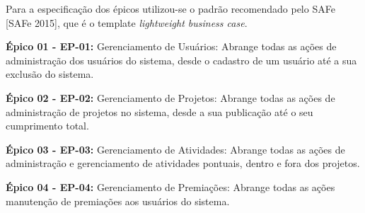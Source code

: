 Para a especificação dos épicos utilizou-se o padrão recomendado pelo SAFe [SAFe 2015], que é o template  \textit{lightweight business case}.

\textbf{Épico 01 - EP-01:} Gerenciamento de Usuários: Abrange todas as ações de administração dos usuários do sistema, desde o cadastro de um usuário até a sua exclusão do sistema.

\textbf{Épico 02 - EP-02:} Gerenciamento de Projetos: Abrange todas as ações de administração de projetos no sistema, desde a sua publicação até o seu cumprimento total.

\textbf{Épico 03 - EP-03:} Gerenciamento de Atividades: Abrange todas as ações de administração e gerenciamento de atividades pontuais, dentro e fora dos projetos.

\textbf{Épico 04 - EP-04:} Gerenciamento de Premiações: Abrange todas as ações manutenção de premiações aos usuários do sistema.

